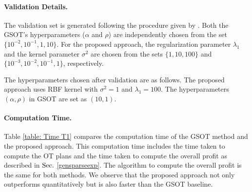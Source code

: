 \paragraph{Validation Details.} The validation set is generated following the procedure given by \citet{ijcai2023p679}. Both the GSOT's hyperparameters ($\alpha$ and $\rho$) are independently chosen from the set $\{10^{-2}, 10^{-1}, 1, 10\}$. For the proposed approach, the regularization parameter $\lambda_1$ and the kernel parameter $\sigma^2$ are chosen from the sets $\{1, 10, 100\}$ and $\{10^{-3}, 10^{-2}, 10^{-1}, 1\}$, respectively.

The hyperparameters chosen after validation are as follows. The proposed approach uses RBF kernel with $\sigma^2 =1$ and $\lambda_1=100$. The hyperparameters $(\alpha, \rho)$ in GSOT are set as $(10, 1)$. 
\paragraph{Computation Time.} Table \ref{table: Time T1} compares the computation time of the GSOT method and the proposed approach. This computation time includes the time taken to compute the OT plans and the time taken to compute the overall profit as described in $\S$ \ref{gensparseexp}. The algorithm to compute the overall profit is the same for both methods. We observe that the proposed approach not only outperforms quantitatively but is also faster than the GSOT baseline.


